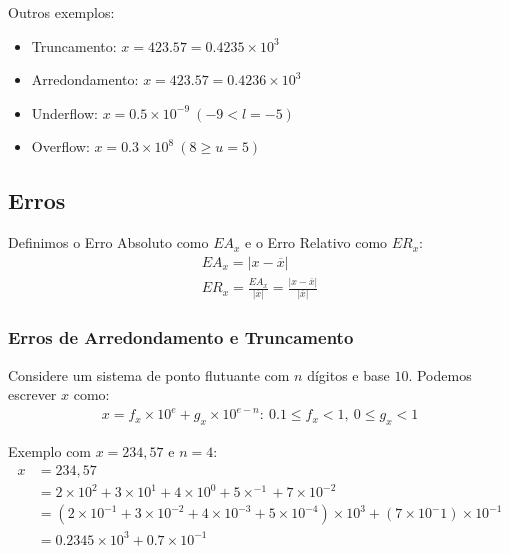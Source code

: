 \documentclass{article}
\begin{document}
        Outros exemplos:
        \begin{itemize}
            \item Truncamento: $x = 423.5\boxed{7} = 0.4235 \times 10^3$
            \item Arredondamento: $x = 423.5\boxed{7} = 0.4236 \times 10^3$
            \item Underflow: $x = 0.5 \times 10^{-9}~(-9 < l = -5)$
            \item Overflow: $x = 0.3 \times 10^8~(8 \ge u = 5)$
        \end{itemize}

    \subsection{Erros}

        Definimos o Erro Absoluto como ${EA}_x$ e o Erro Relativo como ${ER}_x$:
        \begin{gather*}
            {EA}_x = |x - \overline{x}|\\
            {ER}_x = \frac{{EA}_x}{|\overline{x}|} = \frac{|x - \overline{x}|}{|\overline{x}|}
        \end{gather*}

        \subsubsection{Erros de Arredondamento e Truncamento}

            Considere um sistema de ponto flutuante com $n$ dígitos e base $10$. Podemos escrever $x$ como:
            \begin{gather*}
                x = f_x \times 10^e + g_x \times 10^{e-n}:~0.1 \leq f_x < 1,~ 0 \leq g_x < 1
            \end{gather*}

            Exemplo com $x=234,57$ e $n=4$:
            \begin{align*}
                x &= 234,57\\
                &= 2 \times 10^2 + 3 \times 10^1 + 4 \times 10^0 + 5 \times^{-1} + 7 \times 10^{-2}\\
                &= (2 \times 10^{-1} + 3 \times 10^{-2} + 4 \times 10^{-3} + 5 \times 10^{-4}) \times 10^3 + (7 \times 10^-1) \times 10^{-1}\\
                &= 0.2345 \times 10^{3} + 0.7 \times 10^{-1}\\
            \end{align*}
            
\end{document}
